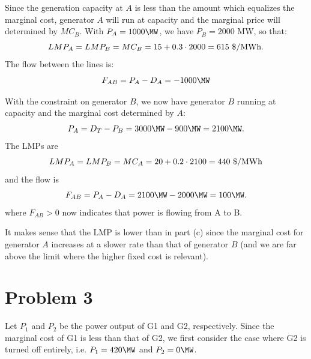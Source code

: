 \documentclass{homework}
\begin{document}
\begin{letterenum}
\item Since the generation capacity at $A$ is less than the amount which equalizes
    the marginal cost, generator $A$ will run at capacity and the marginal price
    will determined by $MC_B$. With $P_A = 1000 \MW$, we have $P_B = 2000$ MW, so
    that:
    \begin{equation*}
        LMP_A = LMP_B = MC_B = 15 + 0.3 \cdot 2000 = 615 \text{ \$/MWh}.
    \end{equation*}
    The flow between the lines is:
    \begin{equation*}
        F_{AB} = P_A - D_A = -1000 \MW
    \end{equation*}

\item With the constraint on generator $B$, we now have generator $B$ running
    at capacity and the marginal cost determined by $A$:
    \begin{equation*}
     P_A = D_T - P_B = 3000 \MW - 900 \MW = 2100 \MW.
    \end{equation*}
    The LMPs are
    \begin{equation*}
        LMP_A = LMP_B = MC_A = 20 + 0.2 \cdot 2100 = 440 \text{ \$/MWh}
    \end{equation*}
    and the flow is
    \begin{equation*}
        F_{AB} = P_A - D_A = 2100 \MW - 2000 \MW = 100 \MW.
    \end{equation*}
    where $F_{AB} > 0$ now indicates that power is flowing from A to B.

    It makes sense that the LMP is lower than in part (c) since the marginal
    cost for generator $A$ increases at a slower rate than that of generator $B$
    (and we are far above the limit where the higher fixed cost is relevant).


\section{Problem 3}

\begin{letterenum}
\item Let $P_1$ and $P_2$ be the power output of G1 and G2, respectively.
Since the marginal cost of G1 is less than that of G2, we first consider the
case where G2 is turned off entirely, i.e. $P_1 = 420 \MW$ and $P_2 = 0 \MW$.


\end{letterenum}
\end{letterenum}
\end{document}
